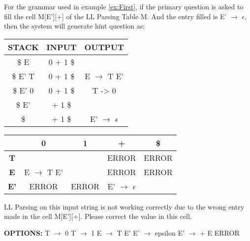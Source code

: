 \begin{example}
\label{ex:LL table input string question}
For the grammar used in example \ref{ex:First}, if the primary question is asked to fill the cell M[E'][+] of the LL Parsing Table M. And the entry filled is E' $\to$ $\epsilon$, then the system will generate hint question as:

\begin{center}
\begin{tabular}{ |c|c|c| } 
 \hline
 \textbf{STACK} & \textbf{INPUT} & \textbf{OUTPUT} \\
 \hline
 \$ E & 0 + 1 \$ & \\
 \$ E' T & 0 + 1 \$ & E $\to$ T E' \\ 
 \$ E' 0 & 0 + 1 \$ & T -> 0 \\
 \$ E' & + 1 \$ & \\ 
 \$ & + 1 \$ & E' $\to$ $\epsilon$ \\
 \hline
\end{tabular}
\end{center}

\begin{center}
\begin{tabular}{ |c|c|c|c|c| } 
 \hline
  & \textbf{0} & \textbf{1} & \textbf{+} & \textbf{\$} \\
 \hline
 \textbf{T} &   &   & ERROR & ERROR \\
 \hline
 \textbf{E} & E $\to$ T E' &   & ERROR & ERROR \\
 \hline
 \textbf{E'} & ERROR & ERROR & E' $\to$ $\epsilon$ & \\
 \hline
\end{tabular}
\end{center}

LL Parsing on this input string is not working correctly due to the wrong entry made in the cell M[E'][+]. Please correct the value in this cell.

\textbf{OPTIONS:} T $\to$ 0 \quad T $\to$ 1 \quad E $\to$ T E' \quad E' $\to$ epsilon \quad E' $\to$ + E \quad ERROR  
\end{example}
